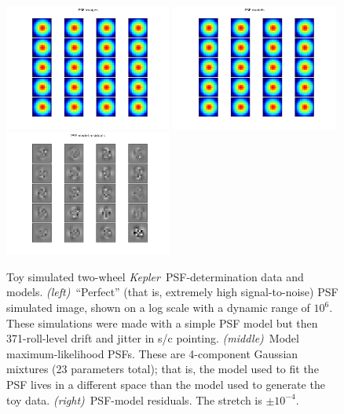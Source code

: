 \documentclass[letterpaper,12pt,whitepaper]{haastex}
\newcommand{\observatory}[1]{\textsl{#1}}
\newcommand{\Kepler}{\observatory{Kepler}}
\begin{document}
\begin{figure}
\includegraphics[width=0.49\textwidth]{sim-100.png}
\includegraphics[width=0.49\textwidth]{sim-101.png}
\includegraphics[width=0.49\textwidth]{sim-102.png}
\caption{Toy simulated two-wheel \Kepler\ PSF-determination data and models.
\textsl{(left)}~``Perfect'' (that is, extremely high signal-to-noise) PSF simulated image, shown on a log scale with a dynamic range of $10^6$.  These simulations were made with a simple PSF model but then 371-roll-level drift and jitter in s/c pointing.
\textsl{(middle)}~Model maximum-likelihood PSFs.  These are 4-component Gaussian mixtures (23 parameters total); that is, the model used to fit the PSF lives in a different space than the model used to generate the toy data.
\textsl{(right)}~PSF-model residuals.  The stretch is $\pm 10^{-4}$.\label{fig:toypsf}}
\end{figure}
\end{document}
